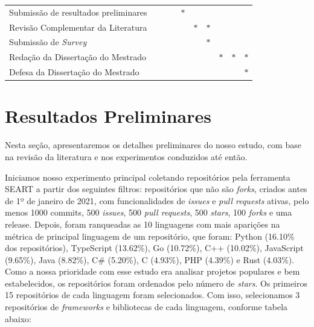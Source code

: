\documentclass[11pt,a4paper]{article}
\newcommand{\en}[1]{\textit{#1}}
\begin{document}
\begin{table}[H]
{\begin{tabular}{lccccccccc}
            Submissão de resultados preliminares              &                           &                           &             & $\bm{\ast}$             &             &             &             &                         &             \\
            Revisão Complementar da Literatura                &                           &                           &             &                         & $\bm{\ast}$ & $\bm{\ast}$ &             &                         &             \\
            Submissão de \en{Survey}                      &                           &                           &             &                         &             & $\bm{\ast}$ &             &                         &             \\
            Redação da Dissertação do Mestrado                &                           &                           &             &                         &             &             & $\bm{\ast}$ & $\bm{\ast}$             & $\bm{\ast}$ \\
            Defesa da Dissertação do Mestrado                 &                           &                           &             &                         &             &             &             &                         & $\bm{\ast}$ \\
            \hline
        \end{tabular}%
    }
\end{table}

\section{Resultados Preliminares}
Nesta seção, apresentaremos os detalhes preliminares do nosso estudo, com base na revisão da literatura e nos experimentos conduzidos até então.

Iniciamos nosso experimento principal coletando repositórios pela ferramenta SEART a partir dos seguintes filtros: repositórios que não são \en{forks}, criados antes de 1º de janeiro de 2021, com funcionalidades de \en{issues} e \en{pull requests} ativas, pelo menos 1000 commits, 500 \en{issues}, 500 \en{pull requests}, 500 \en{stars}, 100 \en{forks} e uma release. Depois, foram ranqueadas as 10 linguagens com mais aparições na métrica de principal linguagem de um repositório, que foram: Python (16.10\% dos repositórios), TypeScript (13.62\%), Go (10.72\%), C++ (10.02\%), JavaScript (9.65\%), Java (8.82\%), C\# (5.20\%), C (4.93\%), PHP (4.39\%) e Rust (4.03\%). Como a nossa prioridade com esse estudo era analisar projetos populares e bem estabelecidos, os repositórios foram ordenados pelo número de \en{stars}. Os primeiros 15 repositórios de cada linguagem foram selecionados. Com isso, selecionamos 3 repositórios de \en{frameworks} e bibliotecas de cada linguagem, conforme tabela abaixo:
\end{document}
